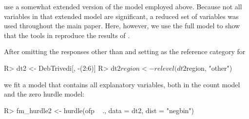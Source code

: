 \documentclass{Z}
\begin{document}
\begin{appendix}
\citet[p.~204]{countreg:Cameron+Trivedi:1998} use a somewhat extended version
of the model employed above. Because not all variables in that extended
model are significant, a reduced set of variables was used throughout the main
paper. Here, however, we use the full model to show that the tools in 
reproduce the results of \cite{countreg:Cameron+Trivedi:1998}.

After omitting the responses other than  and setting 
as the reference category for 
\begin{Schunk}
\begin{Sinput}
R> dt2 <- DebTrivedi[, -(2:6)]
R> dt2$region <- relevel(dt2$region, "other")
\end{Sinput}
\end{Schunk}
we fit a model that contains all explanatory variables, both in the
count model and the zero hurdle model:
\begin{Schunk}
\begin{Sinput}
R> fm_hurdle2 <- hurdle(ofp ~ ., data = dt2, dist = "negbin")
\end{Sinput}
\end{Schunk}


\end{appendix}
\end{document}
